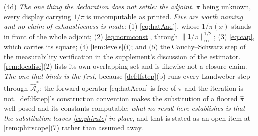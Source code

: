 \begin{remark}
\begin{enumerate}
\textup{(4d)} \emph{The one thing the declaration does not settle: the adjoint.} $\pi$ being unknown,
every display carrying $1/\pi$ is uncomputable as printed. \emph{Five are worth naming and no claim of
exhaustiveness is made}: \textup{(1)} \eqref{eq:hatAadj}, whose $1/\pi(x)$ stands in front of the whole
adjoint; \textup{(2)} \eqref{eq:normconst}, through $\|1/\pi\|_\infty^{1/2}$; \textup{(3)}
\eqref{eq:cap}, which carries its square; \textup{(4)} \cref{lem:levels}\textup{(i)}; and \textup{(5)}
the Cauchy--Schwarz step of the measurability verification in the supplement's discussion of the
estimator. \cref{rem:localise}\textup{(2)} lists its own overlapping set
and is likewise not a closure claim. \emph{The one that binds is the first}, because
\cref{def:lfstep}\textup{(b)} runs every Landweber step through $\hat{\mathcal A}^\ast_\varphi$: the
forward operator \eqref{eq:hatAcon} is free of $\pi$ and the iteration is not.
\cref{def:lfstep}'s construction convention makes the substitution of a floored $\hat\pi$ well posed and
its constants computable; \emph{what no result here establishes is that the substitution leaves
\eqref{eq:phirate} in place}, and that is stated as an open item at
\cref{rem:phirscope}\textup{(7)} rather than assumed away.
\end{enumerate}
\end{remark}

